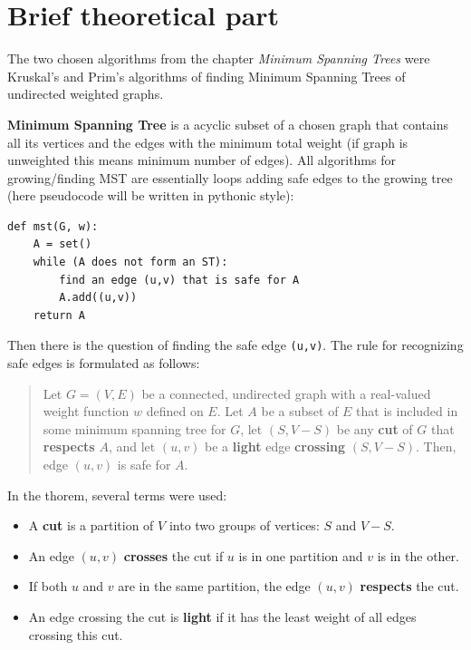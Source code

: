 \documentclass[12pt, a4paper]{article}
\begin{document}
\section*{Brief theoretical part}

The two chosen algorithms from the chapter \textit{Minimum Spanning Trees} were Kruskal's and Prim's algorithms of finding Minimum Spanning Trees of undirected weighted graphs.

\textbf{Minimum Spanning Tree} is a acyclic subset of a chosen graph that contains all its vertices and the edges with the minimum total weight (if graph is unweighted this means minimum number of edges). All algorithms for growing/finding MST are essentially loops adding safe edges to the growing tree (here pseudocode will be written in pythonic style):
\begin{Verbatim}
def mst(G, w):
	A = set()
	while (A does not form an ST):
		find an edge (u,v) that is safe for A
		A.add((u,v))
	return A
\end{Verbatim}

Then there is the question of finding the safe edge \texttt{(u,v)}. The rule for recognizing safe edges is formulated as follows:
\begin{quote}
	Let $G = (V,E)$ be a connected, undirected graph with a real-valued weight function $w$ deﬁned on $E$. Let $A$ be a subset of $E$ that is included in some minimum spanning tree for $G$, let $(S, V-S)$ be any \textbf{cut} of $G$ that \textbf{respects} $A$, and let $(u,v)$ be a \textbf{light} edge \textbf{crossing} $(S, V-S)$. Then, edge $(u,v)$ is safe for $A$.
\end{quote}
In the thorem, several terms were used:
\begin{itemize}
	\item A \textbf{cut} is a partition of $V$ into two groups of vertices: $S$ and $V-S$.
	\item An edge $(u,v)$ \textbf{crosses} the cut if $u$ is in one partition and $v$ is in the other.
	\item If both $u$ and $v$ are in the same partition, the edge $(u,v)$ \textbf{respects} the cut.
	\item An edge crossing the cut is \textbf{light} if it has the least weight of all edges crossing this cut.
\end{itemize}

\newpage
\end{document}
